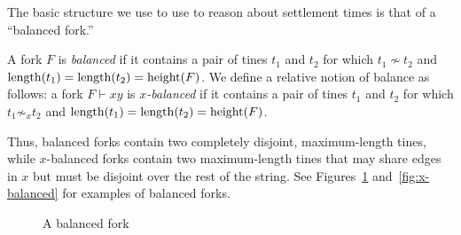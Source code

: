 
The basic structure we use to use to reason about settlement times is
that of a ``balanced fork.''

\begin{definition}\label{def:balanced-fork} A
  fork $F$ is \emph{balanced} if it contains a pair of tines $t_1$ and
  $t_2$ for which $t_1\nsim t_2$ and
  $\operatorname{length}(t_1)=\operatorname{length}(t_2)=\operatorname{height}(F)$. We define a relative notion
  of balance as follows: a fork $F \vdash xy$ is \emph{$x$-balanced}
  if it contains a pair of tines $t_1$ and $t_2$ for which
  $t_1 \not\sim_x t_2$ and $\operatorname{length}(t_1) = \operatorname{length}(t_2) = \operatorname{height}(F)$.
\end{definition}

Thus, balanced forks contain two completely disjoint, maximum-length
tines, while $x$-balanced forks contain two maximum-length tines that
may share edges in $x$ but must be disjoint over the rest of the
string. 
See Figures~\ref{fig:balanced} and~\ref{fig:x-balanced} 
for examples of balanced forks.
\begin{figure}[ht]
  \centering
  \caption{A balanced fork}
  \label{fig:balanced}
\end{figure}

